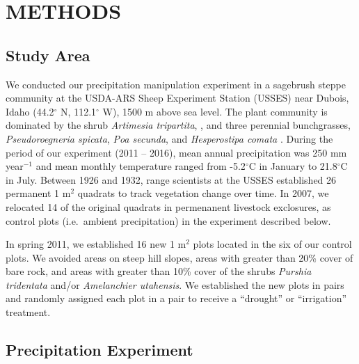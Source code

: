 \documentclass[fleqn,10pt,lineno]{wlpeerj} %
\begin{document}
\hypertarget{methods}{%
\section{METHODS}\label{methods}}

\hypertarget{study-area}{%
\subsection{Study Area}\label{study-area}}

We conducted our precipitation manipulation experiment in a sagebrush
steppe community at the USDA-ARS Sheep Experiment Station (USSES) near
Dubois, Idaho (44.2\(^{\circ}\) N, 112.1\(^{\circ}\) W), 1500 m above
sea level. The plant community is dominated by the shrub
\emph{Artimesia tripartita},
, and three
perennial bunchgrasses, \emph{Pseudoroegneria spicata},
\emph{Poa secunda}, and \emph{Hesperostipa comata}
. During the period of
our experiment (2011 -- 2016), mean annual precipitation was 250 mm
year\(\phantom{}^{-1}\) and mean monthly temperature ranged from
-5.2\(^{\circ}\)C in January to 21.8\(^{\circ}\)C in July. Between 1926
and 1932, range scientists at the USSES established 26 permanent 1
m\(^2\) quadrats to track vegetation change over time. In 2007, we
relocated 14 of the original quadrats in permenanent livestock
exclosures,  as control plots (i.e.~ambient
precipitation) in the experiment described below.

In spring 2011, we established 16 new 1 m\(^2\) plots located in the
 six of our
control plots. We avoided areas on steep hill slopes, areas with greater
than 20\% cover of bare rock, and areas with greater than 10\% cover of
the shrubs \emph{Purshia tridentata} and/or
\emph{Amelanchier utahensis}. We established the new plots in pairs and
randomly assigned each plot in a pair to receive a ``drought'' or
``irrigation'' treatment.

\hypertarget{precipitation-experiment}{%
\subsection{Precipitation Experiment}\label{precipitation-experiment}}
\end{document}
